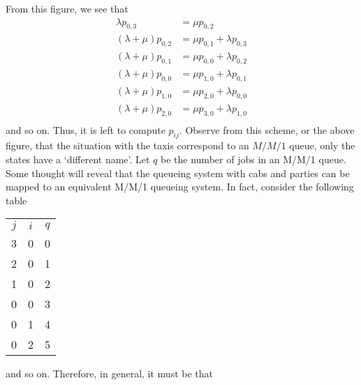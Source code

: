 \begin{exercise}[Hall 5.22]
\begin{solution}
\begin{center}
      
    \end{center}

From this figure, we see that
\begin{align*}
\lambda p_{0,3} &= \mu p_{0,2} \\
(\lambda+\mu) p_{0,2} &= \mu p_{0,1} + \lambda p_{0,3}\\
(\lambda+\mu) p_{0,1} &= \mu p_{0,0} + \lambda p_{0,2}\\
(\lambda+\mu) p_{0,0} &= \mu p_{1,0} + \lambda p_{0,1}\\
(\lambda+\mu) p_{1,0} &= \mu p_{2,0} + \lambda p_{0,0}\\
(\lambda+\mu) p_{2,0} &= \mu p_{3,0} + \lambda p_{1,0}\\
\end{align*}
and so on. Thus, it is left to compute $p_{ij}$. Observe from this
scheme, or the above figure, that the situation with the taxis
correspond to an $M/M/1$ queue, only the states have a `different
name'. Let $q$ be the number of jobs in an M/M/1 queue. Some thought
will reveal that the queueing system with cabs and parties can be
mapped to an equivalent M/M/1 queueing system. In fact, consider the
following table
\begin{center}
\begin{tabular}{ccc}
$j$ & $i$ & $q$\\
3&         0 &         0\\
2 &        0&          1\\
1 &        0&          2\\
0&         0&          3\\
0&         1&          4\\
0&         2&          5\\
\end{tabular}
\end{center}
and so on. Therefore, in general, it must be that 


\end{solution}
\end{exercise}
